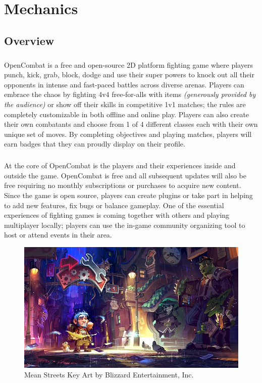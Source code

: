 \chapter{Mechanics}

\section{Overview}

\paragraph{} OpenCombat is a free and open-source 2D platform fighting game where players punch, kick, grab, block, dodge and use their super powers to knock out all their opponents in intense and fast-paced battles across diverse arenas. Players can embrace the chaos by fighting 4v4 free-for-alls with items \textit{(generously provided by the audience)} or show off their skills in competitive 1v1 matches; the rules are completely customizable in both offline and online play. Players can also create their own combatants and choose from 1 of 4 different classes each with their own unique set of moves. By completing objectives and playing matches, players will earn badges that they can proudly display on their profile.

\paragraph{} At the core of OpenCombat is the players and their experiences inside and outside the game. OpenCombat is free and all subsequent updates will also be free requiring no monthly subscriptions or purchases to acquire new content. Since the game is open source, players can create plugins or take part in helping to add new features, fix bugs or balance gameplay. One of the essential experiences of fighting games is coming together with others and playing multiplayer locally; players can use the in-game community organizing tool to host or attend events in their area.

\begin{figure}[h!]
    \centering
    \includegraphics[width=1\linewidth]{images/setting-populated.jpg}
    \caption{Mean Streets Key Art by Blizzard Entertainment, Inc.\nocite{blizzard_entertainment_inc_mean_2016}}
\end{figure}

